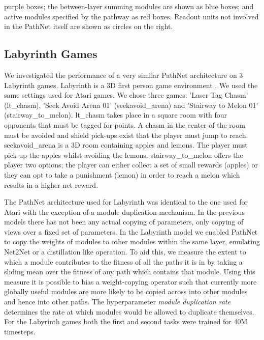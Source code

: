 \documentclass{sig-alternate-05-2015}
\begin{document}
\textcolor{fig2_purple}{purple boxes}; the between-layer summing modules are shown as \textcolor{fig2_blue}{blue boxes}; and active modules specified by the pathway as \textcolor{fig2_red}{red boxes}. Readout units not involved in the PathNet itself are shown as circles on the right. \\

\subsection{Labyrinth Games}
We investigated the performance of a very similar PathNet architecture on 3 Labyrinth games. Labyrinth is a 3D first person game environment \cite{jaderberg2016reinforcement}. We used the same settings used for Atari games. We chose three games: 'Laser Tag Chasm' (lt\_chasm), 'Seek Avoid Arena 01' (seekavoid\_arena) and 'Stairway to Melon 01' (stairway\_to\_melon). lt\_chasm takes place in a square room with four opponents that must be tagged for points. A chasm in the center of the room must be avoided and shield pick-ups exist that the player must jump to reach. seekavoid\_arena is a 3D room containing apples and lemons. The player must pick up the apples whilst avoiding the lemons. stairway\_to\_melon offers the player two options; the player can either collect a set of small rewards (apples) or they can opt to take a punishment (lemon) in order to reach a melon which results in a higher net reward. 

The PathNet architecture used for Labyrinth was identical to the one used for Atari with the exception of a module-duplication mechanism. In the previous models there has not been any actual copying of parameters, only copying of views over a fixed set of parameters. In the Labyrinth model we enabled PathNet to copy the weights of modules to other modules within the same layer, emulating Net2Net \cite{chen2015net2net} or a distillation \cite{hinton2015distilling} like operation. To aid this, we measure the extent to which a module contributes to the fitness of all the paths it is in by taking a sliding mean over the fitness of any path which contains that module. Using this measure it is possible to bias a weight-copying operator such that currently more globally useful modules are more likely to be copied across into other modules and hence into other paths. The hyperparameter \textit{module duplication rate} determines the rate at which modules would be allowed to duplicate themselves. For the Labyrinth games both the first and second tasks were trained for 40M timesteps. \\ 
\end{document}
